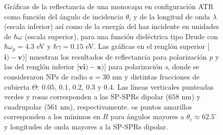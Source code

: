 	\begin{figure}[h!]\centering
{}\vspace*{-.5em}
	\caption{Gráficas de la reflectancia de una monocapa en configuración ATR como función del ángulo de incidencia $\theta_i$ y de la longitud de onda $\lambda$ (escala inferior) así como de la energía del haz incidente en unidades de $\hbar\omega$ (escala superior), para una función dieléctrica tipo Drude con $\hbar\omega_p=4. 3$ eV  y  $\hbar\gamma=0. 15$ eV.  Las gráficas   en el renglón superior [$\mathbf{i)-v)}$]  muestran los resultados de reflectancia para  polarización \emph{p} y las del renglón inferior  [$\mathbf{vi)-x)}$] para polarización  \emph{s}, donde se consideraron NPs de radio $a=30$ nm y distintas fracciones de cubierta $\Theta$: $0. 05$, $0. 1$, $0. 2$, $0. 3$ y $0. 4$. Las líneas verticales punteadas verdes y rosas corresponden a las SP-SPRs dipolar ($658$ nm) y cuadrupolar ($561$ nm), respectivamente.	os puntos amarillos corresponden a los mínimos en $R$ para ángulos mayores a $\theta_c\approx 62.5^\circ$ y longitudes de onda mayores a la SP-SPRs dipolar.}	\label{fig:R-ATR4}	
	\end{figure}	


